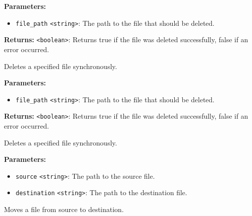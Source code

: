 \documentclass[12pt,a4paper]{article}
\begin{document}
\vspace{5mm}
\noindent {}


\noindent \textbf{Parameters:}
\begin{itemize}
  \item \texttt{file\_path} \texttt{<string>}: The path to the file that should be deleted.
\end{itemize}

\noindent \textbf{Returns:} \texttt{<boolean>}: Returns true if the file was deleted successfully, false if an error occurred.

\noindent Deletes a specified file synchronously.

\vspace{5mm}
\noindent {}


\noindent \textbf{Parameters:}
\begin{itemize}
  \item \texttt{file\_path} \texttt{<string>}: The path to the file that should be deleted.
\end{itemize}

\noindent \textbf{Returns:} \texttt{<boolean>}: Returns true if the file was deleted successfully, false if an error occurred.

\noindent Deletes a specified file synchronously.

\vspace{5mm}
\noindent {}


\noindent \textbf{Parameters:}
\begin{itemize}
  \item \texttt{source} \texttt{<string>}: The path to the source file.
  \item \texttt{destination} \texttt{<string>}: The path to the destination file.
\end{itemize}

\noindent Moves a file from source to destination.

\vspace{5mm}
\noindent {}
\end{document}
